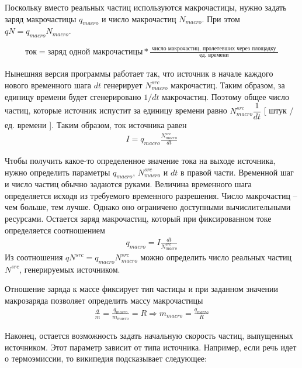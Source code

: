 
Поскольку вместо реальных частиц используются макрочастицы, нужно задать
заряд макрочастицы $q_{macro}$ и число макрочастиц $N_{macro}$.
При этом $q N = q_{macro} N_{macro}$.

\begin{gather}
  \mbox{ток} = 
  \mbox{заряд одной макрочастицы} 
  * \frac{ \mbox{ число макрочастиц, пролетевших через площадку } }
  {\mbox{ ед. времени } }
\end{gather}


Нынешняя версия программы работает так, что 
источник в начале каждого нового временного шага $dt$ генерирует $N_{macro}^{src}$ макрочастиц.
Таким образом, за единицу времени будет сгенерировано $1/dt$ макрочастиц.
Поэтому общее число частиц, которые источник испустит за единицу времени
равно $ N_{macro}^{src} \dfrac{1}{dt} $ [ штук / ед. времени ].
Таким образом, ток источника равен
\begin{gather}
  I = q_{macro} \frac{ N_{macro}^{src}}{dt}
\end{gather}

Чтобы получить какое-то определенное значение тока на выходе источника, 
нужно определить параметры $q_{macro}$, $N_{macro}^{src}$ и $dt$ в правой части.
Временной шаг и число частиц обычно задаются руками. 
Величина временного шага определяется исходя из требуемого временного разрешения.
Число макрочастиц -- чем больше, тем лучше. 
Однако оно ограничено доступными вычислительными ресурсами.
Остается заряд макрочастиц, который при фиксированном токе определяется
соотношением
\begin{gather}
   q_{macro} =  I \frac{dt}{ N_{macro}^{src}}
\end{gather}
Из соотношения $q N^{src} = q_{macro} N_{macro}^{src}$ можно определить число
реальных частиц $N^{src}$, генерируемых источником.

Отношение заряда к массе фиксирует тип частицы и при заданном 
значении макрозаряда позволяет определить массу макрочастицы
\begin{gather}
  \frac{q}{m} = \frac{q_{macro}}{m_{macro}} = R 
  \Rightarrow 
  m_{macro} = \frac{q_{macro}}{R} 
\end{gather}

Наконец, остается возможность задать начальную скорость частиц,
выпущенных источником. Этот параметр зависит от типа источника.
Например, если речь идет о термоэмиссии, то 
википедия подсказывает следующее:

